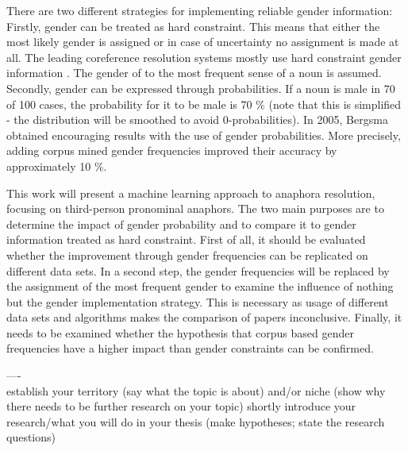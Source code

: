 There are two different strategies for implementing reliable gender information: \\
Firstly, gender can be treated as hard constraint. This means that either the most likely gender is assigned or in case of uncertainty no assignment is made at all. The leading coreference resolution systems mostly use hard constraint gender information \citep{soon2001machine}. The gender of to the most frequent sense of a noun is assumed.\\
Secondly, gender can be expressed through probabilities. If a noun is male in 70 of 100 cases, the probability for it to be male is 70 \% (note that this is simplified - the distribution will be smoothed to avoid 0-probabilities). In \nocite{bergsma2005automatic} 2005, Bergsma obtained encouraging results with the use of gender probabilities. More precisely, adding corpus mined gender frequencies improved their accuracy by approximately 10 \%.

This work will present a machine learning approach to anaphora resolution, focusing on third-person pronominal anaphors. The two main purposes are to determine the impact of gender probability and to compare it to gender information treated as hard constraint. First of all, it should be evaluated whether the improvement through gender frequencies can be replicated on different data sets. In a second step, the gender frequencies will be replaced by the assignment of the most frequent gender to examine the influence of nothing but the gender implementation strategy. This is necessary as usage of different data sets and algorithms makes the comparison of papers inconclusive. Finally, it needs to be examined whether the hypothesis that corpus based gender frequencies have a higher impact than gender constraints can be confirmed.




----\\
establish your territory (say what the topic is about) and/or niche (show why there needs to be further research on your topic)
shortly introduce your research/what you will do in your thesis (make hypotheses; state the research questions)


